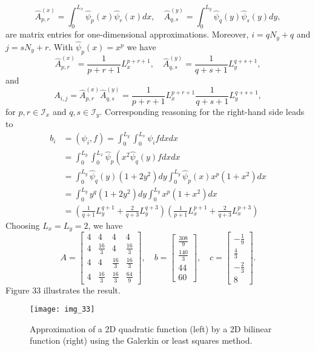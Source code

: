 \documentclass[../main.tex]{subfiles}
\begin{document}
$$
\hat{A}_{p, r}^{(x)}=\int_{0}^{L_{x}} \hat{\psi}_{p}(x) \hat{\psi}_{r}(x) d x, \quad \hat{A}_{q, s}^{(y)}=\int_{0}^{L_{y}} \hat{\psi}_{q}(y) \hat{\psi}_{s}(y) d y,
$$
are matrix entries for one-dimensional approximations. Moreover, $i=q N_{y}+q$ and $j=s N_{y}+r$.
With $\hat{\psi}_{p}(x)=x^{p}$ we have
$$
\hat{A}_{p, r}^{(x)}=\frac{1}{p+r+1} L_{x}^{p+r+1}, \quad \hat{A}_{q, s}^{(y)}=\frac{1}{q+s+1} L_{y}^{q+s+1},
$$
and
$$
A_{i, j}=\hat{A}_{p, r}^{(x)} \hat{A}_{q, s}^{(y)}=\frac{1}{p+r+1} L_{x}^{p+r+1} \frac{1}{q+s+1} L_{y}^{q+s+1},
$$
for $p, r \in \mathcal{I}_{x}$ and $q, s \in \mathcal{I}_{y}$.
Corresponding reasoning for the right-hand side leads to
$$
\begin{aligned}
	b_{i} &=\left(\psi_{i}, f\right)=\int_{0}^{L_{y}} \int_{0}^{L_{x}} \psi_{i} f d x d x \\
	&=\int_{0}^{L_{y}} \int_{0}^{L_{x}} \hat{\psi}_{p}\left(x^{2} \hat{\psi}_{q}(y) f d x d x\right.\\
	&=\int_{0}^{L_{y}} \hat{\psi}_{q}(y)\left(1+2 y^{2}\right) d y \int_{0}^{L_{y}} \hat{\psi}_{p}(x) x^{p}\left(1+x^{2}\right) d x \\
	&=\int_{0}^{L_{y}} y^{q}\left(1+2 y^{2}\right) d y \int_{0}^{L_{y}} x^{p}\left(1+x^{2}\right) d x \\
	&=\left(\frac{1}{q+1} L_{y}^{q+1}+\frac{2}{q+3} L_{y}^{q+3}\right)\left(\frac{1}{p+1} L_{x}^{p+1}+\frac{2}{q+3} L_{x}^{p+3}\right)
\end{aligned}
$$
Choosing $L_{x}=L_{y}=2$, we have
$$
A=\left[\begin{array}{cccc}
	4 & 4 & 4 & 4 \\
	4 & \frac{16}{3} & 4 & \frac{16}{3} \\
	4 & 4 & \frac{16}{3} & \frac{16}{3} \\
	4 & \frac{16}{3} & \frac{16}{3} & \frac{64}{9}
\end{array}\right], \quad b=\left[\begin{array}{c}
	\frac{308}{9} \\
	\frac{140}{3} \\
	44 \\
	60
\end{array}\right], \quad c=\left[\begin{array}{r}
	-\frac{1}{9} \\
	\frac{4}{3} \\
	-\frac{2}{3} \\
	8
\end{array}\right] .
$$
Figure 33 illustrates the result.
\begin{figure}[H]
	\centering
	\texttt{[image: img\_33]}
	\caption{Approximation of a 2D quadratic function (left) by a 2D bilinear
		function (right) using the Galerkin or least squares method.}
	\label{fig:img_33}
\end{figure}
\end{document}
